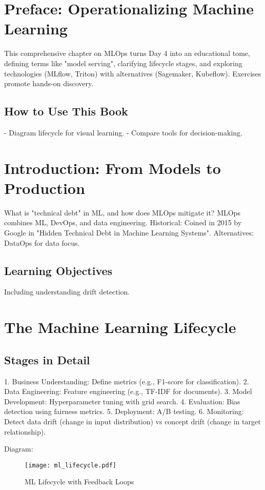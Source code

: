 \documentclass[11pt]{article}
\begin{document}
\tableofcontents
\newpage

\section{Preface: Operationalizing Machine Learning}
This comprehensive chapter on MLOps turns Day 4 into an educational tome, defining terms like "model serving", clarifying lifecycle stages, and exploring technologies (MLflow, Triton) with alternatives (Sagemaker, Kubeflow). Exercises promote hands-on discovery.

\subsection{How to Use This Book}
- Diagram lifecycle for visual learning.
- Compare tools for decision-making.

\section{Introduction: From Models to Production}
What is "technical debt" in ML, and how does MLOps mitigate it? MLOps combines ML, DevOps, and data engineering. Historical: Coined in 2015 by Google in "Hidden Technical Debt in Machine Learning Systems". Alternatives: DataOps for data focus.

\subsection{Learning Objectives}
Including understanding drift detection.

\section{The Machine Learning Lifecycle}
\subsection{Stages in Detail}
1. Business Understanding: Define metrics (e.g., F1-score for classification).
2. Data Engineering: Feature engineering (e.g., TF-IDF for documents).
3. Model Development: Hyperparameter tuning with grid search.
4. Evaluation: Bias detection using fairness metrics.
5. Deployment: A/B testing.
6. Monitoring: Detect data drift (change in input distribution) vs concept drift (change in target relationship).

Diagram:
\begin{figure}[h]
    \centering
    \texttt{[image: ml\_lifecycle.pdf]}
    \caption{ML Lifecycle with Feedback Loops}
\end{figure}
\end{document}
